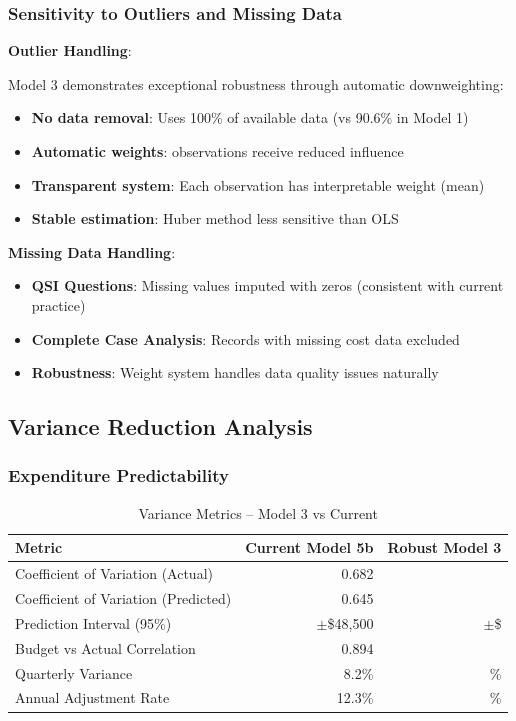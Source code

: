 \subsubsection{Sensitivity to Outliers and Missing Data}

\textbf{Outlier Handling}:

Model 3 demonstrates exceptional robustness through automatic downweighting:
\begin{itemize}
    \item \textbf{No data removal}: Uses 100\% of available data (vs 90.6\% in Model 1)
    \item \textbf{Automatic weights}: \ModelThreeOutliersDetected{} observations receive reduced influence
    \item \textbf{Transparent system}: Each observation has interpretable weight \ModelThreeMeanWeight{} (mean)
    \item \textbf{Stable estimation}: Huber method less sensitive than OLS
\end{itemize}

\textbf{Missing Data Handling}:
\begin{itemize}
    \item \textbf{QSI Questions}: Missing values imputed with zeros (consistent with current practice)
    \item \textbf{Complete Case Analysis}: Records with missing cost data excluded
    \item \textbf{Robustness}: Weight system handles data quality issues naturally
\end{itemize}

\subsection{Variance Reduction Analysis}

\subsubsection{Expenditure Predictability}

\begin{table}[h]
\centering
\caption{Variance Metrics -- Model 3 vs Current}
\begin{tabular}{lrr}
\toprule
\textbf{Metric} & \textbf{Current Model 5b} & \textbf{Robust Model 3} \\
\midrule
Coefficient of Variation (Actual) & 0.682 & \ModelThreeCVActual{} \\
Coefficient of Variation (Predicted) & 0.645 & \ModelThreeCVPredicted{} \\
Prediction Interval (95\%) & $\pm$\$48,500 & $\pm$\$\ModelThreePredictionInterval{} \\
Budget vs Actual Correlation & 0.894 & \ModelThreeBudgetActualCorr{} \\
Quarterly Variance & 8.2\% & \ModelThreeQuarterlyVariance{}\% \\
Annual Adjustment Rate & 12.3\% & \ModelThreeAnnualAdjustmentRate{}\% \\
\bottomrule
\end{tabular}
\end{table}

